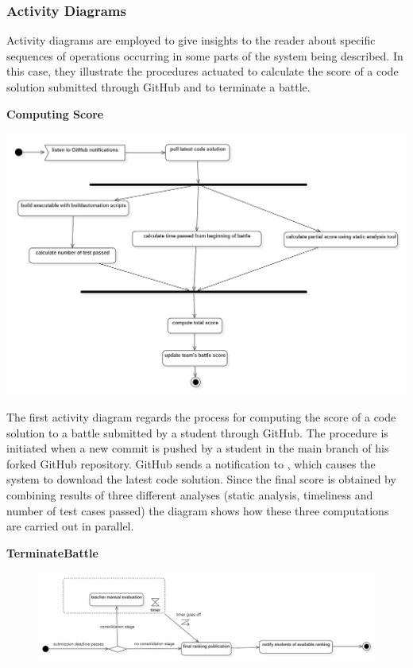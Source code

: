 \subsubsection{Activity Diagrams}
Activity diagrams are employed to give insights to the reader about specific sequences of operations occurring in some parts of the system being described.
In this case, they illustrate the procedures actuated to calculate the score of a code solution submitted through GitHub and to terminate a battle.  \\

\begin{minipage}{\linewidth}
\textbf{Computing Score}\\

   
    \begin{center}
    \includegraphics[width=1\textwidth]{2Overall_Description/res/ActivityDiagramCalculateScore}
    \end{center}
\end{minipage}

The first activity diagram regards the process for computing the score of a code solution to a battle submitted by a student through GitHub. The procedure is initiated when a new commit is pushed by a student in the main branch of his forked GitHub repository. GitHub sends a notification to \app, which causes the system to download the latest code solution. Since the final score is obtained by combining results of three different analyses (static analysis, timeliness and number of test cases passed) the diagram shows how these three computations are carried out in parallel.

\newpage

\textbf{TerminateBattle}\\
\begin{figure}[h]
    \centering
    \includegraphics[width=1\textwidth]{2Overall_Description/res/ActivityDiagramTerminateBattle}
\end{figure}

